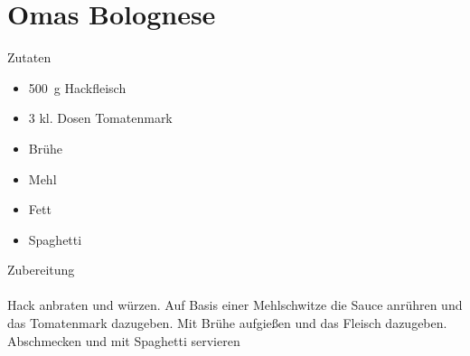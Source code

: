 \section*{Omas Bolognese}
\ihead{}\ohead{}
\cfoot{}
{\Large Zutaten}
\begin{itemize}
    \item \SI{500}{g} Hackfleisch
    \item \num{3} kl. Dosen Tomatenmark
    \item Brühe
    \item Mehl
    \item Fett
    \item Spaghetti
\end{itemize}
\noindent
{\Large Zubereitung}\\
\\
Hack anbraten und würzen.
Auf Basis einer Mehlschwitze die Sauce anrühren und das Tomatenmark dazugeben. 
Mit Brühe aufgießen und das Fleisch dazugeben.
Abschmecken und mit Spaghetti servieren